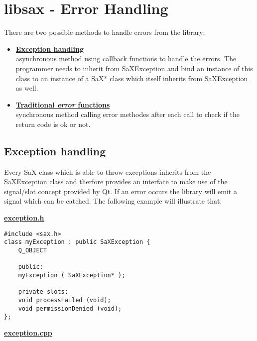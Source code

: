 \chapter{libsax - Error Handling}
\minitoc

There are two possible methods to handle errors from the library:
\begin{itemize}
\item \textbf{\underline{Exception handling}}\\
      asynchronous method using callback functions to handle the errors.
      The programmer needs to inherit from SaXException and bind an instance
      of this class to an instance of a SaX* class which itself inherits from
      SaXException as well.
\item \textbf{\underline{Traditional \textit{error} functions}}\\
      synchronous method calling error methodes after each call to check
      if the return code is ok or not. 
\end{itemize}
\section{Exception handling}
Every SaX class which is able to throw exceptions inherits from the 
SaXException class and therfore provides an interface to make use
of the signal/slot concept provided by Qt. If an error occurs the library
will emit a signal which can be catched. The following example will
illustrate that:

\textbf{\underline{exception.h}}

\begin{Command}{12cm}
\begin{small}
\begin{verbatim}
#include <sax.h>
class myException : public SaXException {
    Q_OBJECT

    public:
    myException ( SaXException* );

    private slots:
    void processFailed (void);
    void permissionDenied (void);
};
\end{verbatim}
\end{small}
\end{Command}

\newpage

\textbf{\underline{exception.cpp}}

